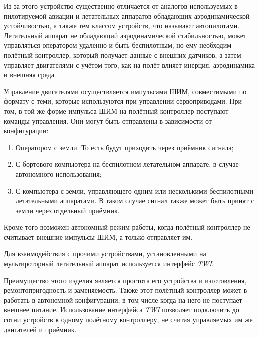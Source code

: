 Из-за этого устройство существенно отличается от аналогов
используемых в пилотируемой авиации и летательных аппаратов обладающих
аэродинамической устойчивостью, а также тем классом устройств, что называют
автопилотами. Летательный аппарат не обладающий аэродинамической
стабильностью, может управляться оператором удаленно и быть
беспилотным, но ему необходим полётный контроллер, который получает
данные с внешних датчиков, а затем управляет двигателями с учётом
того, как на полёт влияет инерция, аэродинамика и внешняя среда.


Управление двигателями осуществляется импульсами ШИМ, совместимыми по
формату с теми, которые используются при управлении
сервоприводами. При том, в той же форме импульса ШИМ на полётный
контроллер поступают команды управления.  Они могут быть отправлены в
зависимости от конфигурации:
\begin{enumerate}
\item Оператором с земли. То есть будут приходить через приёмник сигнала;
\item С бортового компьютера на беспилотном летательном аппарате, в случае автономного использования;
\item С компьютера с земли, управляющего одним или несколькими
беспилотными летательными аппаратами. В таком случае сигнал также
может быть принят с земли через отдельный приёмник.
\end{enumerate}
Кроме того возможен автономный режим работы, когда полётный контроллер
не считывает внешние импульсы ШИМ, а только отправляет им.

Для взаимодействия с прочими устройствами, установленными на
мультироторный летательный аппарат используется интерфейс \textit{TWI}.


Преимущество этого изделия является простота его устройства и
изготовления, ремонтопригодность и заменяемость.
Также этот полётный контроллер может в работать в автономной
конфигурации, в том числе когда на него не поступает внешнее питание.
Использование интерфейса \textit{TWI} позволяет подключить до сотни
устройств к одному полётному контроллеру, не считая управляемых им же
двигателей и приёмник.


